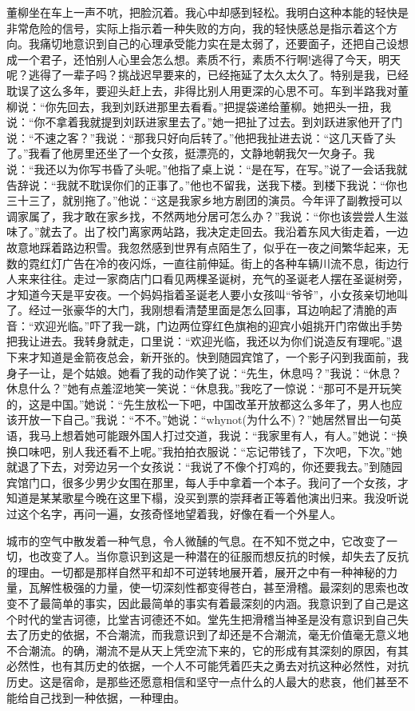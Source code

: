 \documentclass[12pt,oneside]{book}
\begin{document}
董柳坐在车上一声不吭，把脸沉着。我心中却感到轻松。我明白这种本能的轻快是非常危险的信号，实际上指示着一种失败的方向，我的轻快感总是指示着这个方向。我痛切地意识到自己的心理承受能力实在是太弱了，还要面子，还把自己设想成一个君子，还怕别人心里会怎么想。素质不行，素质不行啊!逃得了今天，明天呢？逃得了一辈子吗？挑战迟早要来的，已经拖延了太久太久了。特别是我，已经耽误了这么多年，要迎头赶上去，非得比别人用更深的心思不可。车到半路我对董柳说：``你先回去，我到刘跃进那里去看看。''把提袋递给董柳。她把头一扭，我说：``你不拿着我就提到刘跃进家里去了。''她一把扯了过去。到刘跃进家他开了门说：``不速之客？''我说：``那我只好向后转了。''他把我扯进去说：``这几天昏了头了。''我看了他房里还坐了一个女孩，挺漂亮的，文静地朝我欠一欠身子。我说：``我还以为你写书昏了头呢。''他指了桌上说：``是在写，在写。''说了一会话我就告辞说：``我就不耽误你们的正事了。''他也不留我，送我下楼。到楼下我说：``你也三十三了，就别拖了。''他说：``这是我家乡地方剧团的演员。今年评了副教授可以调家属了，我才敢在家乡找，不然两地分居可怎么办？''我说：``你也该尝尝人生滋味了。''就去了。出了校门离家两站路，我决定走回去。我沿着东风大街走着，一边故意地踩着路边积雪。我忽然感到世界有点陌生了，似乎在一夜之间繁华起来，无数的霓红灯广告在冷的夜闪烁，一直往前伸延。街上的各种车辆川流不息，街边行人来来往往。走过一家商店门口看见两棵圣诞树，充气的圣诞老人摆在圣诞树旁，才知道今天是平安夜。一个妈妈指着圣诞老人要小女孩叫``爷爷''，小女孩亲切地叫了。经过一张豪华的大门，我刚想看清楚里面是怎么回事，耳边响起了清脆的声音：``欢迎光临。''吓了我一跳，门边两位穿红色旗袍的迎宾小姐挑开门帘做出手势把我让进去。我转身就走，口里说：``欢迎光临，我还以为你们说造反有理呢。''退下来才知道是金箭夜总会，新开张的。快到随园宾馆了，一个影子闪到我面前，我身子一让，是个姑娘。她看了我的动作笑了说：``先生，休息吗？''我说：``休息？休息什么？''她有点羞涩地笑一笑说：``休息我。''我吃了一惊说：``那可不是开玩笑的，这是中国。''她说：``先生放松一下吧，中国改革开放都这么多年了，男人也应该开放一下自己。''我说：``不不。''她说：``whynot(为什么不)？''她居然冒出一句英语，我马上想着她可能跟外国人打过交道，我说：``我家里有人，有人。''她说：``换换口味吧，别人我还看不上呢。''我拍拍衣服说：``忘记带钱了，下次吧，下次。''她就退了下去，对旁边另一个女孩说：``我说了不像个打鸡的，你还要我去。''到随园宾馆门口，很多少男少女围在那里，每人手中拿着一个本子。我问了一个女孩，才知道是某某歌星今晚在这里下榻，没买到票的崇拜者正等着他演出归来。我没听说过这个名字，再问一遍，女孩奇怪地望着我，好像在看一个外星人。

城市的空气中散发着一种气息，令人微醺的气息。在不知不觉之中，它改变了一切，也改变了人。当你意识到这是一种潜在的征服而想反抗的时候，却失去了反抗的理由。一切都是那样自然平和却不可逆转地展开着，展开之中有一种神秘的力量，瓦解性极强的力量，使一切深刻性都变得苍白，甚至滑稽。最深刻的思索也改变不了最简单的事实，因此最简单的事实有着最深刻的内涵。我意识到了自己是这个时代的堂吉诃德，比堂吉诃德还不如。堂先生把滑稽当神圣是没有意识到自己失去了历史的依据，不合潮流，而我意识到了却还是不合潮流，毫无价值毫无意义地不合潮流。的确，潮流不是从天上凭空流下来的，它的形成有其深刻的原因，有其必然性，也有其历史的依据，一个人不可能凭着匹夫之勇去对抗这种必然性，对抗历史。这是宿命，是那些还愿意相信和坚守一点什么的人最大的悲哀，他们甚至不能给自己找到一种依据，一种理由。
\end{document}
